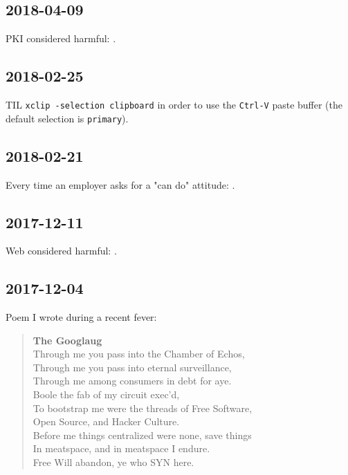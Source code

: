 \documentclass{article}
\begin{document}
\subsection{2018-04-09}
PKI considered harmful: .

\subsection{2018-02-25}
TIL \texttt{xclip -selection clipboard} in order to use the \texttt{Ctrl-V} paste buffer (the default selection is \texttt{primary}).

\subsection{2018-02-21}
Every time an employer asks for a "can do" attitude: .

\subsection{2017-12-11}
Web considered harmful: .

\subsection{2017-12-04}
Poem I wrote during a recent fever:
\begin{center}
\begin{verse}
{\large\textbf{The Googlaug}} \\
Through me you pass into the Chamber of Echos, \\
Through me you pass into eternal surveillance, \\
Through me among consumers in debt for aye. \\
Boole the fab of my circuit exec'd, \\
To bootstrap me were the threads of Free Software, \\
Open Source, and Hacker Culture. \\
Before me things centralized were none, save things \\
In meatspace, and in meatspace I endure. \\
Free Will abandon, ye who SYN here.
\end{verse}
\end{center}
\end{document}
